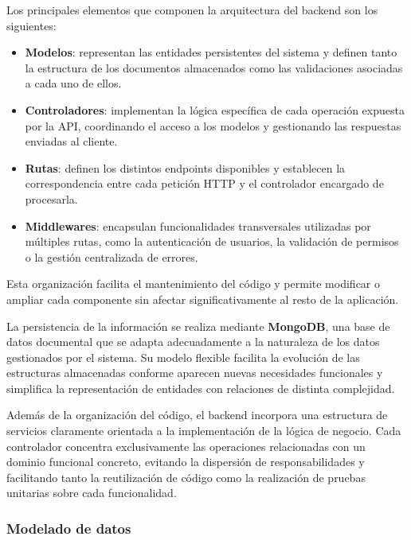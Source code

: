Los principales elementos que componen la arquitectura del backend son los siguientes:

\begin{itemize}
    \item \textbf{Modelos}: representan las entidades persistentes del sistema y definen tanto la estructura de los documentos almacenados como las validaciones asociadas a cada uno de ellos.

    \item \textbf{Controladores}: implementan la lógica específica de cada operación expuesta por la API, coordinando el acceso a los modelos y gestionando las respuestas enviadas al cliente.

    \item \textbf{Rutas}: definen los distintos endpoints disponibles y establecen la correspondencia entre cada petición HTTP y el controlador encargado de procesarla.

    \item \textbf{Middlewares}: encapsulan funcionalidades transversales utilizadas por múltiples rutas, como la autenticación de usuarios, la validación de permisos o la gestión centralizada de errores.
\end{itemize}

Esta organización facilita el mantenimiento del código y permite modificar o ampliar cada componente sin afectar significativamente al resto de la aplicación.

La persistencia de la información se realiza mediante \textbf{MongoDB}, una base de datos documental que se adapta adecuadamente a la naturaleza de los datos gestionados por el sistema. Su modelo flexible facilita la evolución de las estructuras almacenadas conforme aparecen nuevas necesidades funcionales y simplifica la representación de entidades con relaciones de distinta complejidad.

Además de la organización del código, el backend incorpora una estructura de servicios claramente orientada a la implementación de la lógica de negocio. Cada controlador concentra exclusivamente las operaciones relacionadas con un dominio funcional concreto, evitando la dispersión de responsabilidades y facilitando tanto la reutilización de código como la realización de pruebas unitarias sobre cada funcionalidad.

\subsubsection{Modelado de datos}

